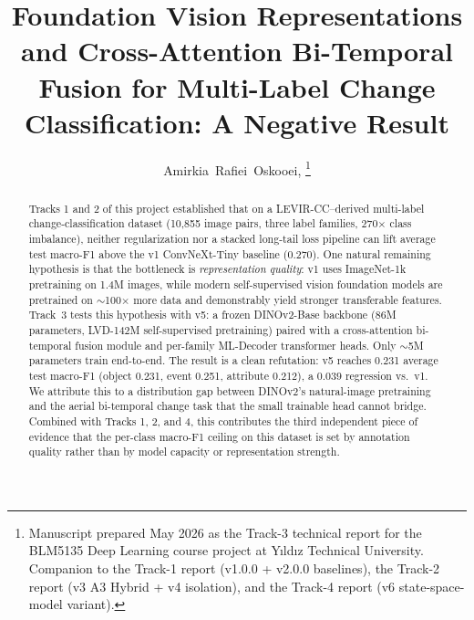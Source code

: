 \documentclass[journal]{IEEEtran}
\begin{document}
\title{Foundation Vision Representations and Cross-Attention Bi-Temporal Fusion for Multi-Label Change Classification: A Negative Result}

\author{%
  Amirkia~Rafiei~Oskooei,
  \thanks{Manuscript prepared May 2026 as the Track-3 technical report for the BLM5135 Deep Learning course project at Y\i ld\i z Technical University. Companion to the Track-1 report (v1.0.0 + v2.0.0 baselines), the Track-2 report (v3 A3 Hybrid + v4 isolation), and the Track-4 report (v6 state-space-model variant).}
}


\maketitle

\begin{abstract}
Tracks 1 and 2 of this project established that on a LEVIR-CC--derived multi-label change-classification dataset (10{,}855 image pairs, three label families, 270$\times$ class imbalance), neither regularization nor a stacked long-tail loss pipeline can lift average test macro-F1 above the v1 ConvNeXt-Tiny baseline (0.270). One natural remaining hypothesis is that the bottleneck is \emph{representation quality}: v1 uses ImageNet-1k pretraining on 1.4M images, while modern self-supervised vision foundation models are pretrained on $\sim$100$\times$ more data and demonstrably yield stronger transferable features. Track~3 tests this hypothesis with v5: a frozen DINOv2-Base backbone (86M parameters, LVD-142M self-supervised pretraining) paired with a cross-attention bi-temporal fusion module and per-family ML-Decoder transformer heads. Only $\sim$5M parameters train end-to-end. The result is a clean refutation: v5 reaches 0.231 average test macro-F1 (object 0.231, event 0.251, attribute 0.212), a $0.039$ regression vs.\ v1. We attribute this to a distribution gap between DINOv2's natural-image pretraining and the aerial bi-temporal change task that the small trainable head cannot bridge. Combined with Tracks 1, 2, and 4, this contributes the third independent piece of evidence that the per-class macro-F1 ceiling on this dataset is set by annotation quality rather than by model capacity or representation strength.
\end{abstract}
\end{document}
